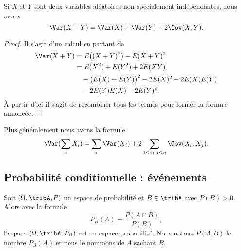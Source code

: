 \begin{proposition}     \label{PropoVarXpYCov}
	Si \( X\) et \( Y\) sont deux variables aléatoires non spécialement indépendantes, nous avons
	\begin{equation}
		\Var(X+Y)=\Var(X)+\Var(Y)+2\Cov(X,Y).
	\end{equation}
\end{proposition}

\begin{proof}
	Il s'agit d'un calcul en partant de
	\begin{equation}
		\begin{aligned}[]
			\Var(X+Y) & =E\big( (X+Y)^2 \big)-E(X+Y)^2                  \\
			          & =E(X^2)+E(Y^2)+2E(XY)                           \\
			          & \quad+\big( E(X)+E(Y) \big)^2-2E(X)^2-2E(X)E(Y) \\
			          & \quad-2 E(Y)E(X)-2E(Y)^2.
		\end{aligned}
	\end{equation}
	À partir d'ici il s'agit de recombiner tous les termes pour former la formule annoncée.
\end{proof}

Plus généralement nous avons la formule
\begin{equation}
	\Var(\sum_i X_i)=\sum_i\Var(X_i)+2\sum_{1\leq i< j\leq n}\Cov(X_i,X_j).
\end{equation}

\subsection{Probabilité conditionnelle : événements}

\begin{propositionDef}      \label{DEFooGJVHooVbhVYv}
	Soit \( (\Omega,\tribA,P)\) un espace de probabilité et \( B\in\tribA\) avec \( P(B)>0\). Alors avec la formule
	\begin{equation}    \label{EqProbCond}
		P_B(A)=\frac{ P(A\cap B) }{ P(B) },
	\end{equation}
	l'espace \( (\Omega,\tribA,P_B)\) est un espace probabilisé. Nous notons \( P(A|B)\) le nombre \( P_B(A) \) et nous le nommons  de \( A\) sachant \( B\).
\end{propositionDef}

